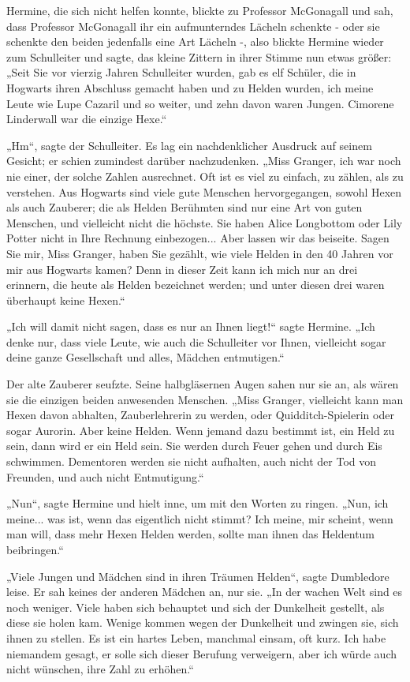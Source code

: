 {Hermine, die sich nicht helfen konnte, blickte zu Professor McGonagall und sah, dass Professor McGonagall ihr ein aufmunterndes Lächeln schenkte - oder sie schenkte den beiden jedenfalls eine Art Lächeln -, also blickte Hermine wieder zum Schulleiter und sagte, das kleine Zittern in ihrer Stimme nun etwas größer: „Seit Sie vor vierzig Jahren Schulleiter wurden, gab es elf Schüler, die in Hogwarts ihren Abschluss gemacht haben und zu Helden wurden, ich meine Leute wie Lupe Cazaril und so weiter, und zehn davon waren Jungen. Cimorene Linderwall war die einzige Hexe.“

„Hm“, sagte der Schulleiter. Es lag ein nachdenklicher Ausdruck auf seinem Gesicht; er schien zumindest darüber nachzudenken. „Miss Granger, ich war noch nie einer, der solche Zahlen ausrechnet. Oft ist es viel zu einfach, zu zählen, als zu verstehen. Aus Hogwarts sind viele gute Menschen hervorgegangen, sowohl Hexen als auch Zauberer; die als Helden Berühmten sind nur eine Art von guten Menschen, und vielleicht nicht die höchste. Sie haben Alice Longbottom oder Lily Potter nicht in Ihre Rechnung einbezogen... Aber lassen wir das beiseite. Sagen Sie mir, Miss Granger, haben Sie gezählt, wie viele Helden in den 40 Jahren vor mir aus Hogwarts kamen? Denn in dieser Zeit kann ich mich nur an drei erinnern, die heute als Helden bezeichnet werden; und unter diesen drei waren überhaupt keine Hexen.“

„Ich will damit nicht sagen, dass es nur an Ihnen liegt!“ sagte Hermine. „Ich denke nur, dass viele Leute, wie auch die Schulleiter vor Ihnen, vielleicht sogar deine ganze Gesellschaft und alles, Mädchen entmutigen.“

Der alte Zauberer seufzte. Seine halbgläsernen Augen sahen nur sie an, als wären sie die einzigen beiden anwesenden Menschen. „Miss Granger, vielleicht kann man Hexen davon abhalten, Zauberlehrerin zu werden, oder Quidditch-Spielerin oder sogar Aurorin. Aber keine Helden. Wenn jemand dazu bestimmt ist, ein Held zu sein, dann wird er ein Held sein. Sie werden durch Feuer gehen und durch Eis schwimmen. Dementoren werden sie nicht aufhalten, auch nicht der Tod von Freunden, und auch nicht Entmutigung.“

„Nun“, sagte Hermine und hielt inne, um mit den Worten zu ringen. „Nun, ich meine... was ist, wenn das eigentlich nicht stimmt? Ich meine, mir scheint, wenn man will, dass mehr Hexen Helden werden, sollte man ihnen das Heldentum beibringen.“

„Viele Jungen und Mädchen sind in ihren Träumen Helden“, sagte Dumbledore leise. Er sah keines der anderen Mädchen an, nur sie. „In der wachen Welt sind es noch weniger. Viele haben sich behauptet und sich der Dunkelheit gestellt, als diese sie holen kam. Wenige kommen wegen der Dunkelheit und zwingen sie, sich ihnen zu stellen. Es ist ein hartes Leben, manchmal einsam, oft kurz. Ich habe niemandem gesagt, er solle sich dieser Berufung verweigern, aber ich würde auch nicht wünschen, ihre Zahl zu erhöhen.“

}
